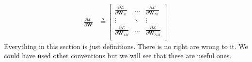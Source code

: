 \begin{align}
    \frac{\partial \mathcal{L}}{\partial \mathbf{W}} &\triangleq 
        \begin{bmatrix}
            \frac{\partial \mathcal{L}}{\partial \mathbf{W}_{11}} & \ldots & \frac{\partial \mathcal{L}}{\partial \mathbf{W}_{N1}} \\
            \vdots & \ddots & \vdots \\
            \frac{\partial \mathcal{L}}{\partial \mathbf{W}_{1M}} & \ldots & \frac{\partial \mathcal{L}}{\partial \mathbf{W}_{NM}} \\
        \end{bmatrix} \label{backprop:scalar_matrix_deriv}
\end{align}
Everything in this section is just definitions. There is no right are wrong to it. We could have used other conventions but we will see that these are useful ones.



